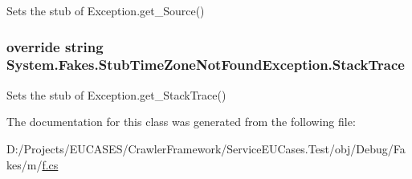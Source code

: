 Sets the stub of Exception.\-get\-\_\-\-Source()

\hypertarget{class_system_1_1_fakes_1_1_stub_time_zone_not_found_exception_ae5568ac2ae442475d7978595645c9530}{
\subsubsection[{Stack\-Trace}]{\setlength{\rightskip}{0pt plus 5cm}override string System.\-Fakes.\-Stub\-Time\-Zone\-Not\-Found\-Exception.\-Stack\-Trace\hspace{0.3cm}{\ttfamily [get]}}}\label{class_system_1_1_fakes_1_1_stub_time_zone_not_found_exception_ae5568ac2ae442475d7978595645c9530}


Sets the stub of Exception.\-get\-\_\-\-Stack\-Trace()



The documentation for this class was generated from the following file\-:\begin{DoxyCompactItemize}
\item 
D\-:/\-Projects/\-E\-U\-C\-A\-S\-E\-S/\-Crawler\-Framework/\-Service\-E\-U\-Cases.\-Test/obj/\-Debug/\-Fakes/m/\hyperlink{m_2f_8cs}{f.\-cs}\end{DoxyCompactItemize}
